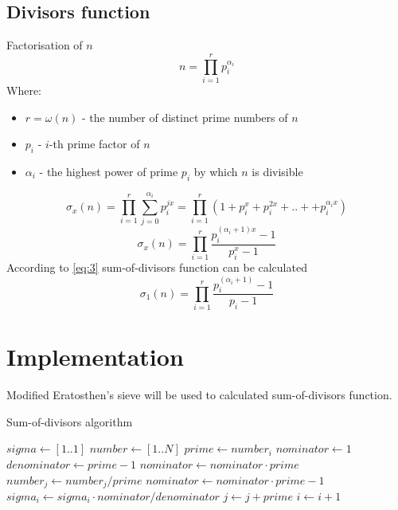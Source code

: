 \documentclass{article}
\begin{document}
\subsection{Divisors function}
Factorisation of $n$
\begin{equation}
    n = \prod_{i=1}^{r}{p_{i}^{\alpha_{i}}}
\end{equation}
Where:
\begin{itemize}
    \item $r = \omega(n)$ - the number of distinct prime numbers of $n$
    \item $p_{i}$ - $i$-th prime factor of $n$
    \item $\alpha_{i}$ - the highest power of prime $p_{i}$ by which $n$ is divisible
\end{itemize}
\begin{equation}
    \sigma_{x}(n) = \prod_{i=1}^{r}{ \sum_{j=0}^{\alpha_{i}}{p_{i}^{jx}}} = 
    \prod_{i=1}^{r}{(1 + p_{i}^{x} + p_{i}^{2x} + .. + + p_{i}^{\alpha_{i}x})}
\end{equation}
\begin{equation} \label{eq:3}
    \sigma_{x}(n) = \prod_{i=1}^{r}{  \frac{p_{i}^{(\alpha_{i}+1)x } - 1}{p_{i}^{x} - 1} }
\end{equation}
According to \eqref{eq:3} sum-of-divisors function can be calculated
\begin{equation} 
    \sigma_{1}(n) = \prod_{i=1}^{r}{  \frac{p_{i}^{(\alpha_{i}+1) } - 1}{p_{i} - 1} }
\end{equation}

\section{Implementation}
Modified Eratosthen's sieve will be used to calculated sum-of-divisors function.

\begin{algorithm}
\caption{Sum-of-divisors algorithm}\label{alg:sigma_1}
\begin{algorithmic}[1]
\State $sigma \gets [1 .. 1]$ 
\State $number \gets [1 .. N]$
     
        \State $prime \gets number_i$
         
            \State $nominator \gets 1$
            \State $denominator \gets prime - 1$
             
                \State $nominator \gets nominator \cdot prime$
                \State $number_j \gets number_j / prime$
            \EndWhile
            \State $nominator \gets nominator \cdot prime - 1$
            \State $sigma_i \gets sigma_i \cdot nominator / denominator$
        \State $j \gets j + prime$
        \EndFor
    \EndIf
    \State $i \gets i + 1$
\EndFor
\end{algorithmic}
\end{algorithm}
\end{document}
